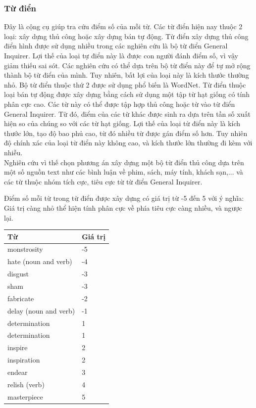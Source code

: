 \subsubsection*{Từ điển}
Đây là cộng cụ giúp tra cứu điểm số của mỗi từ. Các từ điển hiện nay thuộc 2 loại: xây dựng thủ công hoặc xây dựng bán tự động. Từ điển xây dựng thủ công điển hình được sử dụng nhiều trong các nghiên cứu là bộ từ điển General Inquirer. Lợi thế của loại tự điển này là được con người đánh điểm số, vì vậy giảm thiếu sai sót. Các nghiên cứu có thể dựa trên bộ từ điển này để tự mở rộng thành bộ từ điển của mình. Tuy nhiên, bất lợi của loại này là kích thước thường nhỏ. Bộ từ điển thuộc thứ 2 được sử dụng phổ biến là WordNet. Từ điển thuộc loại bán tự động được xây dựng bằng cách sử dụng một tập từ hạt giống có tính phân cực cao. Các từ này có thể được tập hợp thủ công hoặc từ vào từ điển General Inquirer. Từ đó, điểm của các từ khác được sinh ra dựa trên tần số xuất hiện so của chúng so với các từ hạt giống. Lợi thế của loại từ điển này là kích thước lớn, tạo độ bao phủ cao, từ đó nhiều từ được gán điểm số hơn. Tuy nhiên độ chính xác của loại từ điển này không cao, và kích thước lớn thường đi kèm với nhiễu. \\

Nghiên cứu \cite{taboada2011lexicon} vì thế chọn phương án xây dựng một bộ từ điển thủ công dựa trên một số nguồn text như các bình luận về phim, sách, máy tính, khách sạn,... và các từ thuộc nhóm tích cực, tiêu cực từ từ điển General Inquirer. 

Điểm số mỗi từ trong từ điển được xây dựng có giá trị từ -5 đến 5 với ý nghĩa: Giá trị càng nhỏ thể hiện tính phân cực về phía tiêu cực càng nhiều, và ngược lại. 
\begin{table}[H]
\begin{tabular}{l l}
\hline
\textbf{Từ} & \textbf{Giá trị} 
\\ \hline
monstrosity & -5
\\ 
hate (noun and verb) & -4
\\ 
disgust & -3
\\ 
sham & -3
\\ 
fabricate & -2
\\ 
delay (noun and verb) & -1
\\
determination & 1
\\
determination & 1
\\ 
inspire & 2
\\ 
inspiration & 2
\\ 
endear & 3
\\ 
relish (verb) & 4
\\ 
masterpiece & 5
\\ \hline
\end{tabular}
\end{table}

